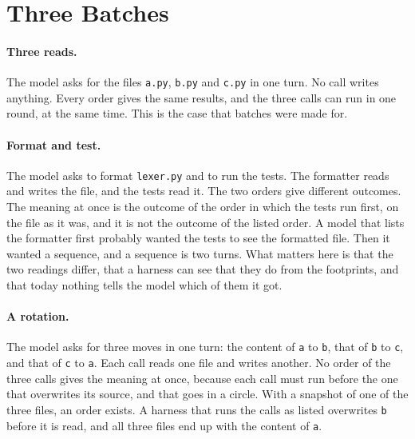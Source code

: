 \documentclass[acmsmall,nonacm,screen]{acmart}
\newcommand{\str}[1]{\texttt{#1}}
\newcommand{\claim}[2]{#2}
\begin{document}
\section{Three Batches}\label{sec:examples}

\paragraph{Three reads.} The model asks for the files \str{a.py}, \str{b.py} and \str{c.py}
in one turn. No call writes anything. \claim{reads}{Every order gives the same results, and
the three calls can run in one round, at the same time.} This is the case that batches were
made for.

\paragraph{Format and test.} The model asks to format \str{lexer.py} and to run the tests.
The formatter reads and writes the file, and the tests read it. \claim{format}{The two
orders give different outcomes. The meaning at once is the outcome of the order in which the
tests run first, on the file as it was, and it is not the outcome of the listed order.} A
model that lists the formatter first probably wanted the tests to see the formatted file.
Then it wanted a sequence, and a sequence is two turns. What matters here is that the two
readings differ, that a harness can see that they do from the footprints, and that today
nothing tells the model which of them it got.

\paragraph{A rotation.} The model asks for three moves in one turn: the content of \str{a}
to \str{b}, that of \str{b} to \str{c}, and that of \str{c} to \str{a}. Each call reads one
file and writes another. \claim{rotate}{No order of the three calls gives the meaning at
once, because each call must run before the one that overwrites its source, and that goes in
a circle. With a snapshot of one of the three files, an order exists.} \claim{rotate-listed}{A harness that runs the calls as listed overwrites \str{b} before it
is read, and all three files end up with the content of \str{a}.}
\end{document}
